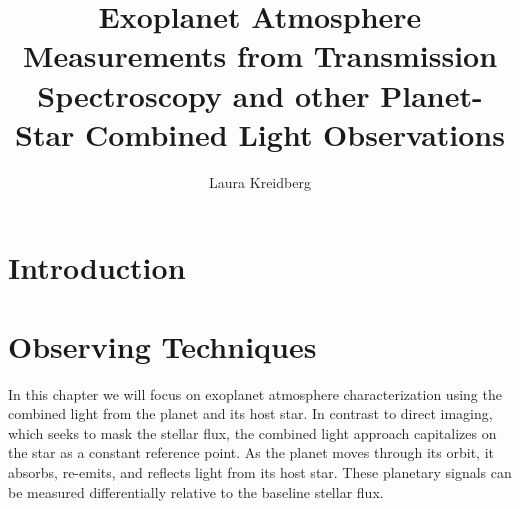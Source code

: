 \documentclass[graybox,natbib,nosecnum]{svmult}
\begin{document}
\title*{Exoplanet Atmosphere Measurements from Transmission Spectroscopy and other Planet-Star Combined Light Observations}
\author{Laura Kreidberg}
%
%
\maketitle




\section{Introduction }



\section{Observing Techniques} 
In this chapter we will focus on exoplanet atmosphere characterization using the combined light from the planet and its host star. In contrast to direct imaging, which seeks to mask the stellar flux, the combined light approach capitalizes on the star as a constant reference point. As the planet moves through its orbit, it absorbs, re-emits, and reflects light from its host star. These planetary signals can be measured differentially relative to the baseline stellar flux.
\end{document}
